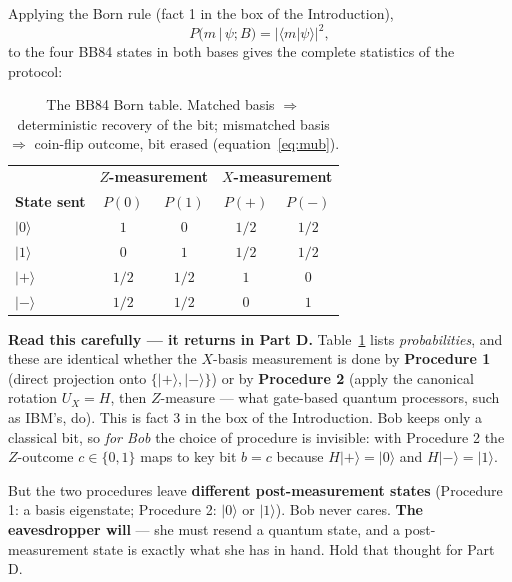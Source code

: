\documentclass[a4paper,11pt]{article}
\providecommand{\ket}[1]{|#1\rangle}
\providecommand{\braket}[2]{\langle#1|#2\rangle}
\begin{document}
Applying the Born rule (fact 1 in the box of the Introduction),
\begin{equation}
    P(m \,|\, \psi; B) = |\braket{m}{\psi}|^2,
    \label{eq:born}
\end{equation}
to the four BB84 states in both bases gives the complete statistics of the protocol:

\begin{table}[H]
\centering
\begin{tabular}{lcccc}
\toprule
 & \multicolumn{2}{c}{\textbf{$Z$-measurement}} & \multicolumn{2}{c}{\textbf{$X$-measurement}} \\
\textbf{State sent} & $P(0)$ & $P(1)$ & $P(+)$ & $P(-)$ \\
\midrule
$\ket{0}$  & $1$   & $0$   & $1/2$ & $1/2$ \\
$\ket{1}$  & $0$   & $1$   & $1/2$ & $1/2$ \\
$\ket{+}$  & $1/2$ & $1/2$ & $1$   & $0$   \\
$\ket{-}$  & $1/2$ & $1/2$ & $0$   & $1$   \\
\bottomrule
\end{tabular}
\caption{The BB84 Born table. Matched basis $\Rightarrow$ deterministic recovery of
the bit; mismatched basis $\Rightarrow$ coin-flip outcome, bit erased
(equation~\eqref{eq:mub}).}
\label{tab:born}
\end{table}

\begin{procedurebox}
\textbf{Read this carefully --- it returns in Part D.} Table~\ref{tab:born} lists
\emph{probabilities}, and these are identical whether the $X$-basis measurement is
done by \textbf{Procedure 1} (direct projection onto $\{\ket{+}, \ket{-}\}$) or by
\textbf{Procedure 2} (apply the canonical rotation $U_X = H$, then $Z$-measure ---
what gate-based quantum processors, such as IBM's, do). This is fact 3 in the box of
the Introduction. Bob keeps only a
classical bit, so \emph{for Bob} the choice of procedure is invisible: with
Procedure 2 the $Z$-outcome $c \in \{0,1\}$ maps to key bit $b = c$ because
$H\ket{+} = \ket{0}$ and $H\ket{-} = \ket{1}$.

\medskip
But the two procedures leave \textbf{different post-measurement states}
(Procedure 1: a basis eigenstate; Procedure 2: $\ket{0}$ or $\ket{1}$). Bob never
cares. \textbf{The eavesdropper will} --- she must resend a quantum state, and a
post-measurement state is exactly what she has in hand. Hold that thought for
Part D.
\end{procedurebox}
\end{document}
